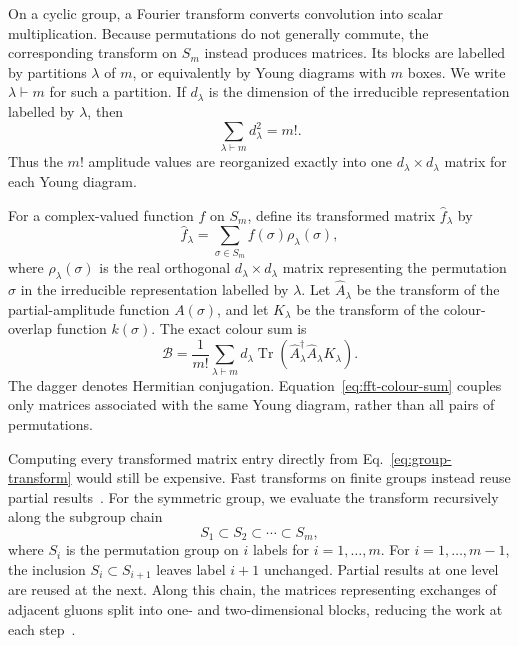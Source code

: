 \documentclass[aps,prd,twocolumn,superscriptaddress,nofootinbib]{revtex4-2}
\begin{document}
On a cyclic group, a Fourier transform converts convolution into scalar
multiplication.  Because permutations do not generally commute, the
corresponding transform on $S_m$ instead produces matrices.  Its blocks are
labelled by partitions $\lambda$ of $m$, or equivalently by Young diagrams
with $m$ boxes.  We write $\lambda\vdash m$ for such a partition.  If
$d_\lambda$ is the dimension of the
irreducible representation labelled by $\lambda$, then
\begin{equation}
  \sum_{\lambda\vdash m}d_\lambda^2=m!.
  \label{eq:young-counting}
\end{equation}
Thus the $m!$ amplitude values are reorganized exactly into one
$d_\lambda\times d_\lambda$ matrix for each Young diagram.

For a complex-valued function $f$ on $S_m$, define its transformed matrix
$\widehat f_\lambda$ by
\begin{equation}
  \widehat f_\lambda
  =\sum_{\sigma\in S_m}f(\sigma)\rho_\lambda(\sigma),
  \label{eq:group-transform}
\end{equation}
where $\rho_\lambda(\sigma)$ is the real orthogonal
$d_\lambda\times d_\lambda$ matrix representing the permutation $\sigma$ in
the irreducible representation labelled by $\lambda$.  Let
$\widehat A_\lambda$ be the transform of the partial-amplitude function
$A(\sigma)$, and let $K_\lambda$ be the transform of the colour-overlap
function $k(\sigma)$.  The exact colour sum is
\begin{equation}
  \mathcal B=\frac{1}{m!}
  \sum_{\lambda\vdash m}d_\lambda
  \operatorname{Tr}\!\left(
    \widehat A_\lambda^\dagger
    \widehat A_\lambda K_\lambda
  \right).
  \label{eq:fft-colour-sum}
\end{equation}
The dagger denotes Hermitian conjugation.
Equation~\eqref{eq:fft-colour-sum} couples only matrices associated with the
same Young diagram, rather than all pairs of permutations.

Computing every transformed matrix entry directly from
Eq.~\eqref{eq:group-transform} would still be expensive.  Fast transforms on
finite groups instead reuse partial results~\cite{DiaconisRockmore1990}.  For
the symmetric group, we evaluate the transform recursively along the subgroup
chain
\begin{equation}
  S_1\subset S_2\subset\cdots\subset S_m,
  \label{eq:subgroup-chain}
\end{equation}
where $S_i$ is the permutation group on $i$ labels for $i=1,\ldots,m$.  For
$i=1,\ldots,m-1$, the inclusion $S_i\subset S_{i+1}$ leaves label $i+1$
unchanged.  Partial results at one level are reused at the next.  Along this
chain, the matrices representing exchanges of adjacent gluons split into
one- and two-dimensional blocks, reducing the work at each
step~\cite{ClausenBaum1993,Maslen1998}.
\end{document}
